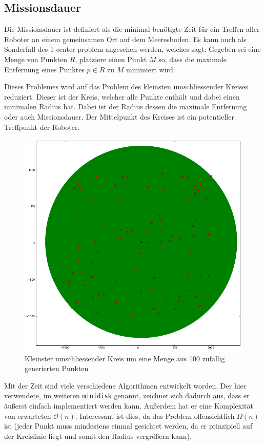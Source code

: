 \documentclass{article}
\begin{document}
\subsection{Missionsdauer}

Die Missionsdauer ist definiert als die minimal benötigte Zeit für ein Treffen aller Roboter an 
einem gemeinsamen Ort auf dem Meeresboden. Es kann auch als Sonderfall des 1-center problem angesehen werden,
welches sagt: Gegeben sei eine Menge von Punkten $R$, platziere einen Punkt $M$ so, dass die maximale Entfernung
eines Punktes $p \in R$ zu $M$ minimiert wird. 

Dieses Problemes wird auf das Problem des kleinsten umschliessender Kreises reduziert. Dieser ist der Kreis,
welcher alle Punkte enthält und dabei einen minimalen Radius hat. Dabei ist der Radius dessen die maximale Entfernung oder
auch Missionsdauer. Der Mittelpunkt des Kreises ist ein potentieller Treffpunkt der Roboter.

\begin{figure}[!ht]
  \centering
  \includegraphics[width=.9\textwidth]{img/kuk_100.png}
  \caption{Kleinster umschliessender Kreis um eine Menge aus 100 zufällig generierten Punkten}
  \label{img:kuk_100}
\end{figure}

Mit der Zeit sind viele verschiedene Algorithmen entwickelt worden. Der hier verwendete, im weiteren \texttt{minidisk} genannt,
zeichnet sich dadurch aus, dass er äußerst einfach implementiert werden kann. Außerdem hat er eine Komplexität von erwarteten 
$\mathcal O(n)$. Interessant ist dies, da das Problem offensichtlich $\Omega (n)$ ist (jeder Punkt muss mindestens einmal 
gesichtet werden, da er prinzipiell auf der Kreislinie liegt und somit den Radius vergrößern kann).
\end{document}
